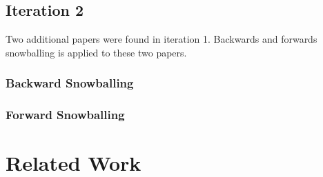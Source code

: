 \subsection{Iteration 2}
Two additional papers were found in iteration 1. Backwards and forwards snowballing is applied to these two papers.

\subsubsection{Backward Snowballing}

\subsubsection{Forward Snowballing}

\section{Related Work}










